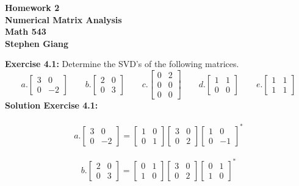 \documentclass[12pt]{article}
\begin{document}
	
	\begin{center}
		\textbf{Homework 2} \\
		\textbf{Numerical Matrix Analysis} \\
		\textbf{Math 543} \\
		\textbf{Stephen Giang} \\
	\end{center}

\noindent \textbf{Exercise 4.1: } Determine the SVD's of the following matrices. \\
$$
	a. \begin{bmatrix}
			3 & 0 \\
			0 & -2
		\end{bmatrix} \qquad
	b. \begin{bmatrix}
			2 & 0 \\
			0 & 3
		\end{bmatrix} \qquad
	c. \begin{bmatrix}
			0 & 2 \\
			0 & 0 \\
			0 & 0	
		\end{bmatrix} \qquad
	d. \begin{bmatrix}
			1 & 1 \\
			0 & 0 
		\end{bmatrix} \qquad
	e. \begin{bmatrix}
			1 & 1 \\
			1 & 1		
		\end{bmatrix}
$$
\textbf{Solution Exercise 4.1: } \\\\
$$
	a. \begin{bmatrix}
			3 & 0 \\
			0 & -2
		\end{bmatrix} =
		\begin{bmatrix}
			1 & 0 \\
			0 & 1 
		\end{bmatrix}
		\begin{bmatrix}
			3 & 0 \\
			0 & 2 
		\end{bmatrix}
		\begin{bmatrix}
			1 & 0 \\
			0 & -1 
		\end{bmatrix}^*		
$$ \\
$$
	b. \begin{bmatrix}
			2 & 0 \\
			0 & 3
		\end{bmatrix} =
		\begin{bmatrix}
			0 & 1 \\
			1 & 0 
		\end{bmatrix}
		\begin{bmatrix}
			3 & 0 \\
			0 & 2 
		\end{bmatrix}
		\begin{bmatrix}
			0 & 1 \\
			1 & 0 
		\end{bmatrix}^*		
$$ \\
\end{document}
